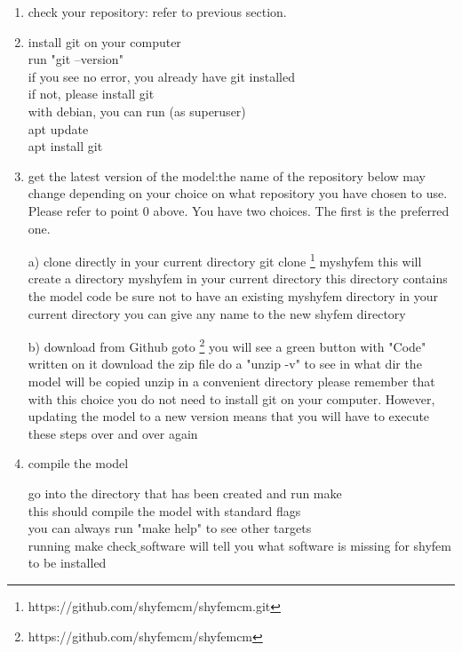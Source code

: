 \begin{enumerate}
\item  check your repository: refer to previous section.

\item  install git on your computer\\

	run "git --version"\\
	if you see no error, you already have git installed\\
	if not, please install git\\
	with debian, you can run (as superuser)\\
		apt update\\
		apt install git\\

\item  get the latest version of the model:the name of the repository below may change depending on
	your choice on what repository you have chosen to use. Please refer to point 0 above. You have two choices. The first is the preferred one.

	\subitem a) clone directly in your current directory
		git clone  \footnote{https://github.com/shyfemcm/shyfemcm.git} myshyfem
		this will create a directory myshyfem in your current directory
		this directory contains the model code
		be sure not to have an existing myshyfem directory
			in your current directory
		you can give any name to the new shyfem directory
	
	\subitem b) download from Github
		goto  \footnote{https://github.com/shyfemcm/shyfemcm}
		you will see a green button with "Code" written on it
		download the zip file
		do a "unzip -v" to see in what dir the model will be copied
		unzip in a convenient directory
		please remember that with this choice you do not need
		to install git on your computer. However, updating
		the model to a new version means that you will have
		to execute these steps over and over again

\item compile the model

	go into the directory that has been created and run
		make\\
	this should compile the model with standard flags\\
	you can always run "make help" to see other targets\\
	running make check$\_$software will tell you what software is missing for shyfem to be installed
	

\end{enumerate}

